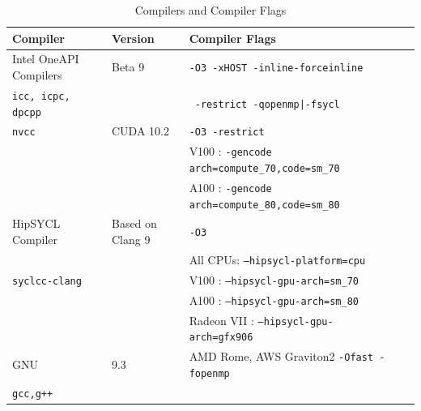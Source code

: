 \documentclass[runningheads]{llncs}
\begin{document}
\begin{table}[!t]\footnotesize
\centering
\caption{\small Compilers and Compiler Flags
\normalsize}\vspace{-8pt}
\begin{tabular}{lllll} \hline
Compiler	    &	Version 	& Compiler Flags\\\hline
Intel OneAPI Compilers     &	Beta 9 	& \texttt{-O3 -xHOST  -inline-forceinline } \\
\texttt{icc, icpc, dpcpp}  & &\texttt{ -restrict -qopenmp|-fsycl}  \\\hline
\texttt{nvcc}  	    &   CUDA 10.2  	&  \texttt{-O3 -restrict}\\
&&V100 : \texttt{-gencode 
arch=compute\_70,code=sm\_70} \\
&& A100 : \texttt{-gencode arch=compute\_80,code=sm\_80} \\\hline
HipSYCL Compiler & Based on Clang 9 & \texttt{-O3}\\
&& All CPUs: \texttt{--hipsycl-platform=cpu} \\
\texttt{syclcc-clang}&&V100 : \texttt{--hipsycl-gpu-arch=sm\_70} \\
&& A100 : \texttt{--hipsycl-gpu-arch=sm\_80} \\
&& Radeon VII : \texttt{--hipsycl-gpu-arch=gfx906} \\\hline
GNU 	    &   9.3 &  AMD Rome, AWS Graviton2 \texttt{-Ofast -fopenmp}  \\ 
\texttt{gcc,g++}     &  &   \texttt{ } \\\hline
\end{tabular}\label{tab/compilers}\vspace{-15pt}
\end{table}\normalsize
\end{document}
